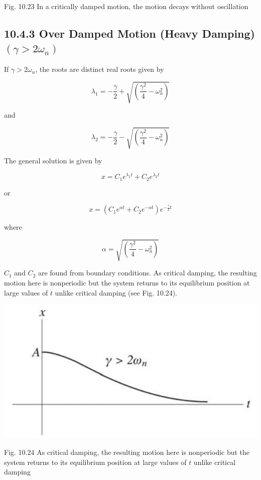 \documentclass[10pt]{article}
\begin{document}
Fig. 10.23 In a critically damped motion, the motion decays without oscillation

\subsection*{10.4.3 Over Damped Motion (Heavy Damping) $\left(\gamma>2 \omega_{n}\right)$}
If $\gamma>2 \omega_{n}$, the roots are distinct real roots given by

$$
\lambda_{1}=-\frac{\gamma}{2}+\sqrt{\left(\frac{\gamma^{2}}{4}-\omega_{n}^{2}\right)}
$$

and

$$
\lambda_{2}=-\frac{\gamma}{2}-\sqrt{\left(\frac{\gamma^{2}}{4}-\omega_{n}^{2}\right)}
$$

The general solution is given by

$$
x=C_{1} e^{\lambda_{1} t}+C_{2} e^{\lambda_{2} t}
$$

or

$$
x=\left(C_{1} e^{\alpha t}+C_{2} e^{-\alpha t}\right) e^{-\frac{\gamma}{2} t}
$$

where

$$
\alpha=\sqrt{\left(\frac{\gamma^{2}}{4}-\omega_{n}^{2}\right)}
$$

$C_{1}$ and $C_{2}$ are found from boundary conditions. As critical damping, the resulting motion here is nonperiodic but the system returns to its equilibrium position at large values of $t$ unlike critical damping (see Fig. 10.24).

\begin{center}
\includegraphics[max width=\textwidth]{2024_09_13_db1f357d2aad0a03eb2eg-175}
\end{center}

Fig. 10.24 As critical damping, the resulting motion here is nonperiodic but the system returns to its equilibrium position at large values of $t$ unlike critical damping
\end{document}
